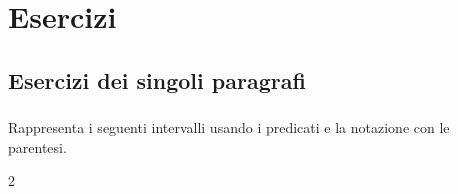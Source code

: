 
\section{Esercizi}

\subsection{Esercizi dei singoli paragrafi}

\subsubsection*{}

\begin{esercizio}
\label{ese:dis_1}
Rappresenta i seguenti intervalli usando i predicati e la notazione con le 
parentesi.
\begin{htmulticols}{2}
\begin{enumeratea}
\item \raisebox{-3mm}
{}
\item \raisebox{-3mm}
{}
\item \raisebox{-3mm}
{}
\item \raisebox{-3mm}
{}
\item \raisebox{-3mm}
{}
\item \raisebox{-3mm}
{}
\item \raisebox{-3mm}
{}
\item \raisebox{-3mm}
{}
\end{enumeratea}
\end{htmulticols}
\end{esercizio}


